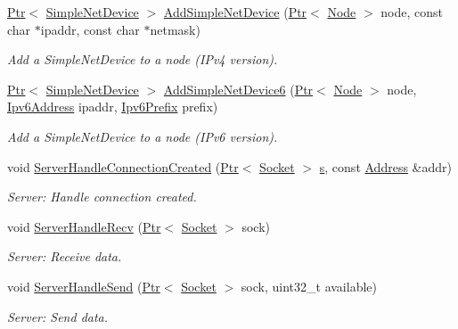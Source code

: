\begin{DoxyCompactItemize}
\hyperlink{classns3_1_1Ptr}{Ptr}$<$ \hyperlink{classns3_1_1SimpleNetDevice}{Simple\+Net\+Device} $>$ \hyperlink{classTcpTestCase_a0cbbee626d01b80c78677c0a957ffd88}{Add\+Simple\+Net\+Device} (\hyperlink{classns3_1_1Ptr}{Ptr}$<$ \hyperlink{classns3_1_1Node}{Node} $>$ node, const char $\ast$ipaddr, const char $\ast$netmask)
\begin{DoxyCompactList}\small\item\em Add a Simple\+Net\+Device to a node (I\+Pv4 version). \end{DoxyCompactList}\item 
\hyperlink{classns3_1_1Ptr}{Ptr}$<$ \hyperlink{classns3_1_1SimpleNetDevice}{Simple\+Net\+Device} $>$ \hyperlink{classTcpTestCase_a4385a5d6f0b5fcf2dbbe1cccb0810ea9}{Add\+Simple\+Net\+Device6} (\hyperlink{classns3_1_1Ptr}{Ptr}$<$ \hyperlink{classns3_1_1Node}{Node} $>$ node, \hyperlink{classns3_1_1Ipv6Address}{Ipv6\+Address} ipaddr, \hyperlink{classns3_1_1Ipv6Prefix}{Ipv6\+Prefix} prefix)
\begin{DoxyCompactList}\small\item\em Add a Simple\+Net\+Device to a node (I\+Pv6 version). \end{DoxyCompactList}\item 
void \hyperlink{classTcpTestCase_a92ee004cc017259628ac1731ca4e040a}{Server\+Handle\+Connection\+Created} (\hyperlink{classns3_1_1Ptr}{Ptr}$<$ \hyperlink{classns3_1_1Socket}{Socket} $>$ \hyperlink{generate__test__data__lte__sinr_8m_ad83eeb3a142285d1243a08c6b7026df8}{s}, const \hyperlink{classns3_1_1Address}{Address} \&addr)
\begin{DoxyCompactList}\small\item\em Server\+: Handle connection created. \end{DoxyCompactList}\item 
void \hyperlink{classTcpTestCase_a42ede7664eb853794823d249b65df402}{Server\+Handle\+Recv} (\hyperlink{classns3_1_1Ptr}{Ptr}$<$ \hyperlink{classns3_1_1Socket}{Socket} $>$ sock)
\begin{DoxyCompactList}\small\item\em Server\+: Receive data. \end{DoxyCompactList}\item 
void \hyperlink{classTcpTestCase_a1ba2bc3a0a5e84e07437e48e632fdbda}{Server\+Handle\+Send} (\hyperlink{classns3_1_1Ptr}{Ptr}$<$ \hyperlink{classns3_1_1Socket}{Socket} $>$ sock, uint32\+\_\+t available)
\begin{DoxyCompactList}\small\item\em Server\+: Send data. \end{DoxyCompactList}\item 

\end{DoxyCompactItemize}
